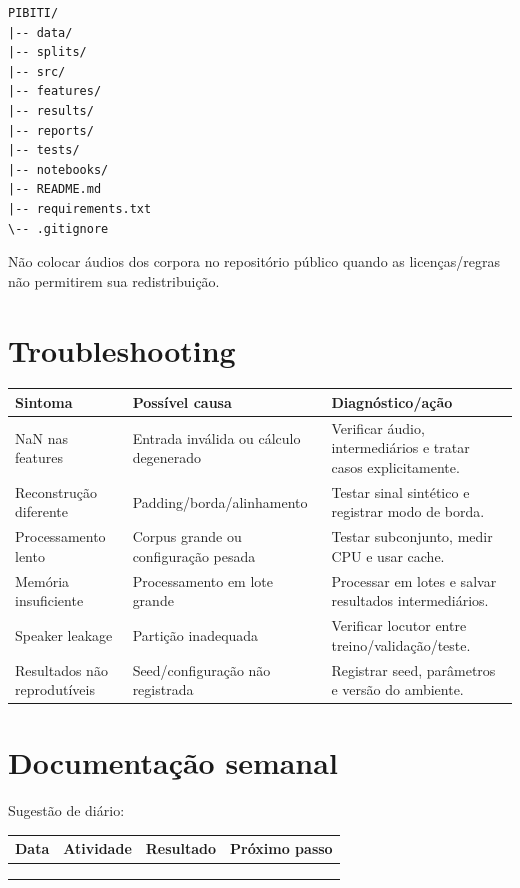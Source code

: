 \documentclass[12pt,a4paper]{article}
\begin{document}
\begin{lstlisting}
PIBITI/
|-- data/
|-- splits/
|-- src/
|-- features/
|-- results/
|-- reports/
|-- tests/
|-- notebooks/
|-- README.md
|-- requirements.txt
\-- .gitignore
\end{lstlisting}

Não colocar áudios dos corpora no repositório público quando as licenças/regras não permitirem sua redistribuição.

\section{Troubleshooting}

\begin{longtable}{p{3cm}p{4cm}p{7cm}}
\toprule
Sintoma & Possível causa & Diagnóstico/ação\\
\midrule
NaN nas features & Entrada inválida ou cálculo degenerado & Verificar áudio, intermediários e tratar casos explicitamente.\\
Reconstrução diferente & Padding/borda/alinhamento & Testar sinal sintético e registrar modo de borda.\\
Processamento lento & Corpus grande ou configuração pesada & Testar subconjunto, medir CPU e usar cache.\\
Memória insuficiente & Processamento em lote grande & Processar em lotes e salvar resultados intermediários.\\
Speaker leakage & Partição inadequada & Verificar locutor entre treino/validação/teste.\\
Resultados não reprodutíveis & Seed/configuração não registrada & Registrar seed, parâmetros e versão do ambiente.\\
\bottomrule
\end{longtable}

\section{Documentação semanal}

Sugestão de diário:

\begin{center}
\begin{tabular}{p{2cm}p{3cm}p{4cm}p{3cm}}
\toprule
Data & Atividade & Resultado & Próximo passo\\
\midrule
& & &\\
& & &\\
& & &\\
\bottomrule
\end{tabular}
\end{center}
\end{document}
